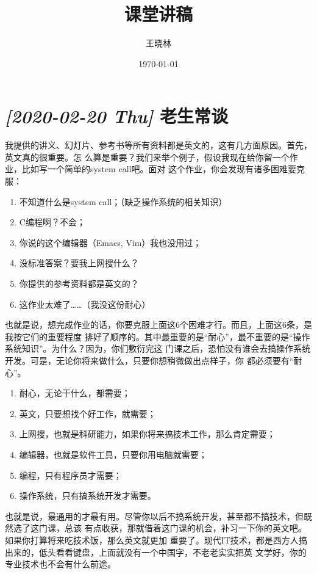 \documentclass{wx672ctexart} [NO-DEFAULT-PACKAGES] \usepackage{wx672hyperref}
\author{王晓林}
\date{\today}
\title{课堂讲稿}
\begin{document}
\maketitle
\tableofcontents


\section{\textit{[2020-02-20 Thu] } 老生常谈}
\label{sec:orga552b0f}

我提供的讲义、幻灯片、参考书等所有资料都是英文的，这有几方面原因。首先，英文真的很重要。怎
么算是重要？我们来举个例子，假设我现在给你留一个作业，比如写一个简单的system call吧。面对
这个作业，你会发现有诸多困难要克服：
\begin{enumerate}
\item 不知道什么是system call；（缺乏操作系统的相关知识）
\item C编程啊？不会；
\item 你说的这个编辑器（Emacs, Vim）我也没用过；
\item 没标准答案？要我上网搜什么？
\item 你提供的参考资料都是英文的？
\item 这作业太难了……（我没这份耐心）
\end{enumerate}

也就是说，想完成作业的话，你要克服上面这6个困难才行。而且，上面这6条，是我按它们的重要程度
排好了顺序的。其中最重要的是“耐心”，最不重要的是“操作系统知识”。为什么？因为，你们敷衍完这
门课之后，恐怕没有谁会去搞操作系统开发。可是，无论你将来做什么，只要你想稍微做出点样子，你
都必须要有“耐心”。
\begin{enumerate}
\item 耐心，无论干什么，都需要；
\item 英文，只要想找个好工作，就需要；
\item 上网搜，也就是科研能力，如果你将来搞技术工作，那么肯定需要；
\item 编辑器，也就是软件工具，只要你用电脑就需要；
\item 编程，只有程序员才需要；
\item 操作系统，只有搞系统开发才需要。
\end{enumerate}

也就是说，最通用的才最有用。尽管你以后不搞系统开发，甚至都不搞技术，但既然选了这门课，总该
有点收获，那就借着这门课的机会，补习一下你的英文吧。如果你打算将来吃技术饭，那么英文就更加
重要了。现代IT技术，都是西方人搞出来的，低头看看键盘，上面就没有一个中国字，不老老实实把英
文学好，你的专业技术也不会有什么前途。
\end{document}
